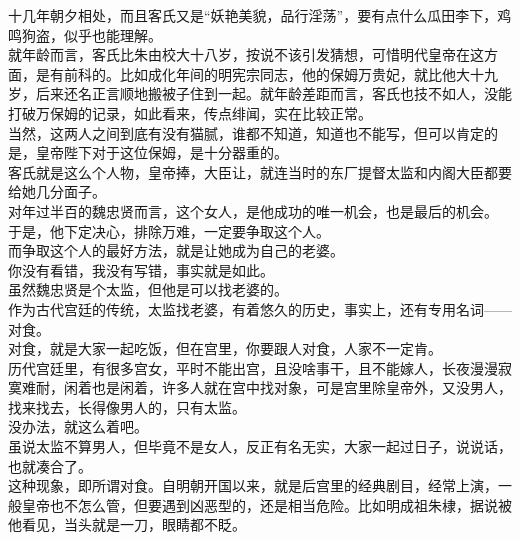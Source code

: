 \begin{multicols}{\theparacolNo}
十几年朝夕相处，而且客氏又是“妖艳美貌，品行淫荡”，要有点什么瓜田李下，鸡鸣狗盗，似乎也能理解。\\

就年龄而言，客氏比朱由校大十八岁，按说不该引发猜想，可惜明代皇帝在这方面，是有前科的。比如成化年间的明宪宗同志，他的保姆万贵妃，就比他大十九岁，后来还名正言顺地搬被子住到一起。就年龄差距而言，客氏也技不如人，没能打破万保姆的记录，如此看来，传点绯闻，实在比较正常。\\

当然，这两人之间到底有没有猫腻，谁都不知道，知道也不能写，但可以肯定的是，皇帝陛下对于这位保姆，是十分器重的。\\

客氏就是这么个人物，皇帝捧，大臣让，就连当时的东厂提督太监和内阁大臣都要给她几分面子。\\

对年过半百的魏忠贤而言，这个女人，是他成功的唯一机会，也是最后的机会。\\

于是，他下定决心，排除万难，一定要争取这个人。\\

而争取这个人的最好方法，就是让她成为自己的老婆。\\

你没有看错，我没有写错，事实就是如此。\\

虽然魏忠贤是个太监，但他是可以找老婆的。\\

作为古代宫廷的传统，太监找老婆，有着悠久的历史，事实上，还有专用名词——对食。\\

对食，就是大家一起吃饭，但在宫里，你要跟人对食，人家不一定肯。\\

历代宫廷里，有很多宫女，平时不能出宫，且没啥事干，且不能嫁人，长夜漫漫寂寞难耐，闲着也是闲着，许多人就在宫中找对象，可是宫里除皇帝外，又没男人，找来找去，长得像男人的，只有太监。\\

没办法，就这么着吧。\\

虽说太监不算男人，但毕竟不是女人，反正有名无实，大家一起过日子，说说话，也就凑合了。\\

这种现象，即所谓对食。自明朝开国以来，就是后宫里的经典剧目，经常上演，一般皇帝也不怎么管，但要遇到凶恶型的，还是相当危险。比如明成祖朱棣，据说被他看见，当头就是一刀，眼睛都不眨。\\


\end{multicols}
